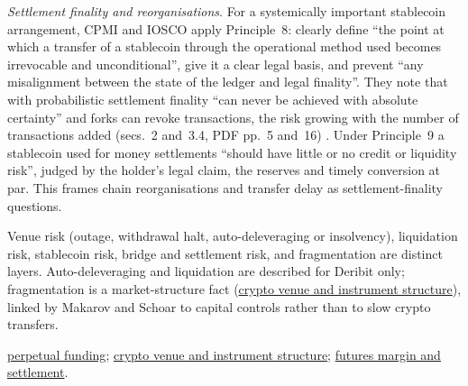 \begin{qfdefinition}
\emph{Settlement finality and reorganisations}. For a systemically important stablecoin arrangement, CPMI and IOSCO apply Principle~8: clearly define ``the point at which a transfer of a stablecoin through the operational method used becomes irrevocable and unconditional'', give it a clear legal basis, and prevent ``any misalignment between the state of the ledger and legal finality''. They note that with probabilistic settlement finality ``can never be achieved with absolute certainty'' and forks can revoke transactions, the risk growing with the number of transactions added (secs.~2 and~3.4, PDF pp.~5 and~16) \citep[July 2022, secs.~2 and~3.4]{cd-cpmi-iosco-stablecoin-pfmi-2022}. Under Principle~9 a stablecoin used for money settlements ``should have little or no credit or liquidity risk'', judged by the holder's legal claim, the reserves and timely conversion at par. This frames chain reorganisations and transfer delay as settlement-finality questions.

 Venue risk (outage, withdrawal halt, auto-deleveraging or insolvency), liquidation risk, stablecoin risk, bridge and settlement risk, and fragmentation are distinct layers. Auto-deleveraging and liquidation are described for Deribit only; fragmentation is a market-structure fact (\hyperref[def:crypto-venue-instrument-structure]{crypto venue and instrument structure}), linked by Makarov and Schoar to capital controls rather than to slow crypto transfers.

 \hyperref[mech:perpetual-funding]{perpetual funding}; \hyperref[def:crypto-venue-instrument-structure]{crypto venue and instrument structure}; \hyperref[mech:futures-margin-settlement]{futures margin and settlement}.

\end{qfdefinition}
